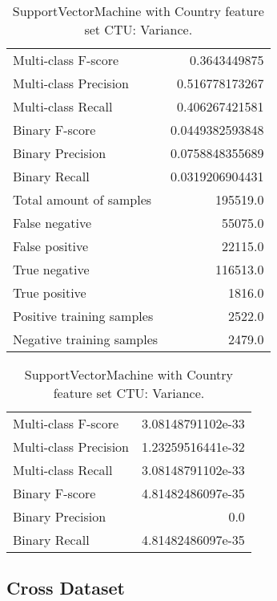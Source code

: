 \begin{table}[H]
\begin{minipage}{0.5\textwidth}
\caption{SupportVectorMachine with Country feature set CTU: Average.}
\centering
\begin{tabular}{l r}
\toprule
Multi-class F-score & 0.3643449875 \\
Multi-class Precision & 0.516778173267 \\
Multi-class Recall & 0.406267421581 \\
\midrule
Binary F-score & 0.0449382593848 \\
Binary Precision & 0.0758848355689 \\
Binary Recall & 0.0319206904431 \\
\midrule
Total amount of samples & 195519.0 \\
False negative & 55075.0 \\
False positive & 22115.0 \\
True negative & 116513.0 \\
True positive & 1816.0 \\
\midrule
Positive training samples & 2522.0 \\
Negative training samples & 2479.0 \\
\bottomrule
\end{tabular}
\end{minipage}
\hfillx
\begin{minipage}{0.5\textwidth}
\caption{SupportVectorMachine with Country feature set CTU: Variance.}
\centering
\begin{tabular}{l r}
\toprule
Multi-class F-score & 3.08148791102e-33 \\
Multi-class Precision & 1.23259516441e-32 \\
Multi-class Recall & 3.08148791102e-33 \\
\midrule
Binary F-score & 4.81482486097e-35 \\
Binary Precision & 0.0 \\
Binary Recall & 4.81482486097e-35 \\
\bottomrule
\end{tabular}
\end{minipage}
\end{table}

\newpage
\subsection{Cross Dataset}


